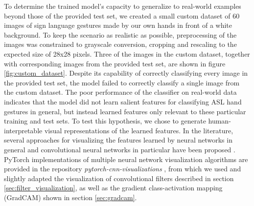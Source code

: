 \documentclass[a4paper]{article}
\begin{document}
To determine the trained model's capacity to generalize to real-world examples beyond those of the provided test set, we created a small custom dataset of 60 images of sign language gestures made by our own hands in front of a white background. To keep the scenario as realistic as possible, preprocessing of the images was constrained to grayscale conversion, cropping and rescaling to the expected size of 28x28 pixels. Three of the images in the custom dataset, together with corresponding images from the provided test set, are shown in figure \ref{fig:custom_dataset}. Despite its capability of correctly classifying every image in the provided test set, the model failed to correctly classify a single image from the custom dataset. The poor performance of the classifier on real-world data indicates that the model did not learn salient features for classifying ASL hand gestures in general, but instead learned features only relevant to these particular training and test sets. To test this hypothesis, we chose to generate human-interpretable visual representations of the learned features. In the literature, several approaches for visualizing the features learned by neural networks in general and convolutional neural networks in particular have been proposed \cite{Qin2018}. PyTorch implementations of multiple neural network visualization algorithms are provided in the repository \textit{pytorch-cnn-visualizations} \cite{Ozbulak2018}, from which we used and slightly adapted the visualization of convolutional filters described in section \ref{sec:filter_visualization}, as well as the gradient class-activation mapping (GradCAM) shown in section \ref{sec:gradcam}.
\end{document}
